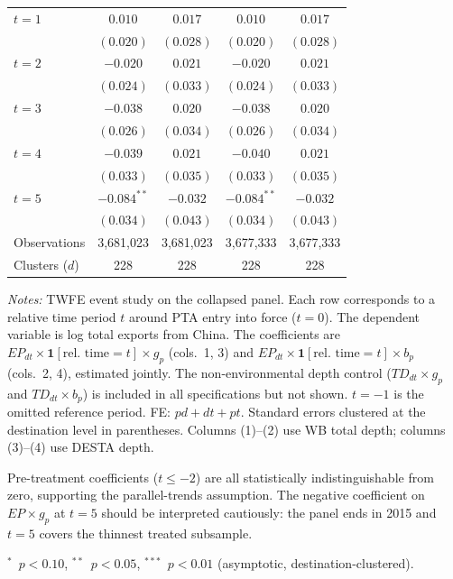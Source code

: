 \documentclass{article}
\begin{document}
\begin{table}[htbp]
\begin{threeparttable}
\begin{tabular}{lcccc}
$t=1$  & $0.010$         & $0.017$         & $0.010$         & $0.017$         \\
       & $(0.020)$       & $(0.028)$       & $(0.020)$       & $(0.028)$       \\[4pt]
$t=2$  & $-0.020$        & $0.021$         & $-0.020$        & $0.021$         \\
       & $(0.024)$       & $(0.033)$       & $(0.024)$       & $(0.033)$       \\[4pt]
$t=3$  & $-0.038$        & $0.020$         & $-0.038$        & $0.020$         \\
       & $(0.026)$       & $(0.034)$       & $(0.026)$       & $(0.034)$       \\[4pt]
$t=4$  & $-0.039$        & $0.021$         & $-0.040$        & $0.021$         \\
       & $(0.033)$       & $(0.035)$       & $(0.033)$       & $(0.035)$       \\[4pt]
$t=5$  & $-0.084^{**}$   & $-0.032$        & $-0.084^{**}$   & $-0.032$        \\
       & $(0.034)$       & $(0.043)$       & $(0.034)$       & $(0.043)$       \\[4pt]
\midrule
Observations   & 3,681,023 & 3,681,023 & 3,677,333 & 3,677,333 \\
Clusters ($d$) & 228       & 228       & 228       & 228       \\
\bottomrule
\end{tabular}
\begin{tablenotes}[flushleft]\footnotesize
\item \emph{Notes:} TWFE event study on the collapsed panel. Each row corresponds to a relative time period $t$ around PTA entry into force ($t=0$). The dependent variable is log total exports from China. The coefficients are $EP_{dt} \times \mathbf{1}[\text{rel.\ time}=t] \times g_p$ (cols.\ 1, 3) and $EP_{dt} \times \mathbf{1}[\text{rel.\ time}=t] \times b_p$ (cols.\ 2, 4), estimated jointly. The non-environmental depth control ($TD_{dt} \times g_p$ and $TD_{dt} \times b_p$) is included in all specifications but not shown. $t=-1$ is the omitted reference period. FE: $pd + dt + pt$. Standard errors clustered at the destination level in parentheses. Columns (1)--(2) use WB total depth; columns (3)--(4) use DESTA depth.
\item Pre-treatment coefficients ($t \leq -2$) are all statistically indistinguishable from zero, supporting the parallel-trends assumption. The negative coefficient on $EP \times g_p$ at $t=5$ should be interpreted cautiously: the panel ends in 2015 and $t=5$ covers the thinnest treated subsample.
\item $^{*}$~$p<0.10$, $^{**}$~$p<0.05$, $^{***}$~$p<0.01$ (asymptotic, destination-clustered).
\end{tablenotes}
\end{threeparttable}
\end{table}
\end{document}
